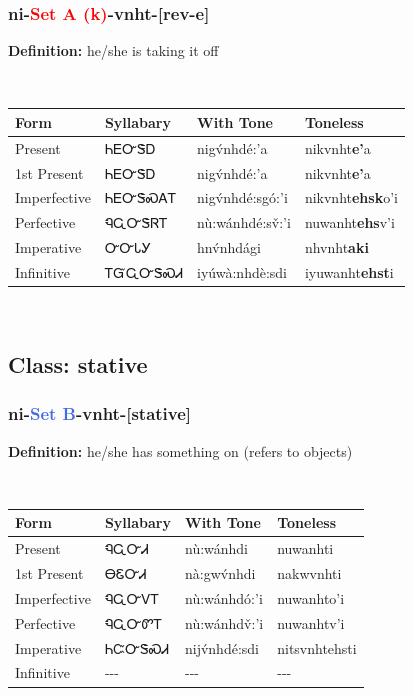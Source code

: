 \subsubsection*{ni{-}\textcolor{Red}{Set A (k)}{-}\textbf{vnht}{-}[rev-e]}
\nopagebreak
\textbf{Definition: } he/she is taking it off
\\[0.5em]
\begin{tabularx}{\textwidth}{l X X X}%
\toprule%
\textbf{Form}&\textbf{Syllabary}&\textbf{With Tone}&\textbf{Toneless}\\%
\midrule%
Present&ᏂᎬᏅᏕᎠ&nigv́nhdé:’a&nikvnht\textbf{e'}a\\%
1st Present&ᏂᎬᏅᏕᎠ&nigv́nhdé:’a&nikvnht\textbf{e'}a\\%
Imperfective&ᏂᎬᏅᏕᏍᎪᎢ&nigv́nhdé:sgó:’i&nikvnht\textbf{ehsk}o'i\\%
Perfective&ᏄᏩᏅᏕᏒᎢ&nù:wánhdé:sv̌:’i&nuwanht\textbf{ehs}v'i\\%
Imperative&ᏅᏅᏓᎩ&hnv́nhdági&nhvnht\textbf{aki}\\%
Infinitive&ᎢᏳᏩᏅᏕᏍᏗ&iyúwà:nhdè:sdi&iyuwanht\textbf{ehst}i\\%
\bottomrule%
\end{tabularx}
\\[1em]
\needspace{3in}
\subsection*{Class: stative}
\nopagebreak
\needspace{2in}
\subsubsection*{ni{-}\textcolor{RoyalBlue}{Set B}{-}\textbf{vnht}{-}[stative]}
\nopagebreak
\textbf{Definition: } he/she has something on (refers to objects)
\\[0.5em]
\begin{tabularx}{\textwidth}{l X X X}%
\toprule%
\textbf{Form}&\textbf{Syllabary}&\textbf{With Tone}&\textbf{Toneless}\\%
\midrule%
Present&ᏄᏩᏅᏗ&nù:wánhdi&nuwanhti\\%
1st Present&ᎾᏋᏅᏗ&nà:gwv́nhdi&nakwvnhti\\%
Imperfective&ᏄᏩᏅᏙᎢ&nù:wánhdó:’i&nuwanhto'i\\%
Perfective&ᏄᏩᏅᏛᎢ&nù:wánhdv̌:’i&nuwanhtv'i\\%
Imperative&ᏂᏨᏅᏕᏍᏗ&nijv́nhdé:sdi&nitsvnhtehsti\\%
Infinitive&{-}{-}{-}&{-}{-}{-}&{-}{-}{-}\\%
\bottomrule%
\end{tabularx}
\\[1em]